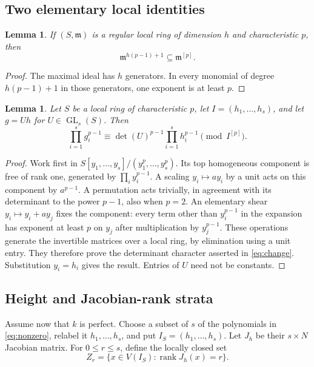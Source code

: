 \documentclass[11pt]{article}
\newtheorem{lemma}[theorem]{Lemma}
\theoremstyle{definition}\newtheorem{definition}[theorem]{Definition}
\theoremstyle{remark}\newtheorem{remark}[theorem]{Remark}
\DeclareMathOperator{\rank}{rank}
\newcommand{\m}{\mathfrak m}
\numberwithin{equation}{section}
\begin{document}
\subsection{Two elementary local identities}
\begin{lemma}\label{lem:pigeonhole}
If $(S,\m)$ is a regular local ring of dimension $h$ and
characteristic $p$, then
\begin{equation}\label{eq:pigeonhole}
 \m^{h(p-1)+1}\subseteq\m^{[p]}.
\end{equation}
\end{lemma}
\begin{proof}
The maximal ideal has $h$ generators. In every monomial of degree
$h(p-1)+1$ in those generators, one exponent is at least $p$.
\end{proof}

\begin{lemma}\label{lem:change}
Let $S$ be a local ring of characteristic $p$, let
$I=(h_1,\ldots,h_s)$, and let $g=Uh$ for $U\in\operatorname{GL}_s(S)$.
Then
\begin{equation}\label{eq:change}
 \prod_{i=1}^{s}g_i^{p-1}
 \equiv\det(U)^{p-1}\prod_{i=1}^{s}h_i^{p-1}\pmod{I^{[p]}}.
\end{equation}
\end{lemma}
\begin{proof}
Work first in $S[y_1,\ldots,y_s]/(y_1^p,\ldots,y_s^p)$.
Its top homogeneous component is free of rank one, generated by
$\prod_i y_i^{p-1}$. A scaling $y_i\mapsto ay_i$ by a unit acts
on this component by $a^{p-1}$. A permutation acts trivially, in
agreement with its determinant to the power $p-1$, also when $p=2$.
An elementary shear $y_i\mapsto y_i+ay_j$ fixes the component:
every term other than $y_i^{p-1}$ in the expansion has exponent at
least $p$ on $y_j$ after multiplication by $y_j^{p-1}$.
These operations generate the invertible matrices over a local
ring, by elimination using a unit entry. They therefore prove the
determinant character asserted in \eqref{eq:change}. Substitution
$y_i=h_i$ gives the result. Entries of $U$ need not be constants.
\end{proof}

\subsection{Height and Jacobian-rank strata}
Assume now that $k$ is perfect. Choose a subset of $s$ of the
polynomials in \eqref{eq:nonzero}, relabel it $h_1,\ldots,h_s$, and
put $I_S=(h_1,\ldots,h_s)$. Let $J_h$ be their $s\times N$
Jacobian matrix. For $0\le r\le s$, define the locally closed set
\[
 Z_r=\{x\in V(I_S):\rank J_h(x)=r\}.
\]
\end{document}
